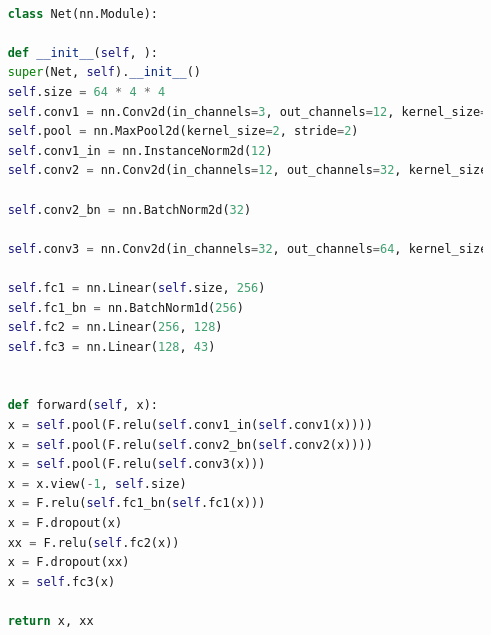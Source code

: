 \documentclass[twoside, 11pt,a4paper]{article}
\numberwithin{equation}{section}
\begin{document}
	\begin{lstlisting}[language=Python, caption=Kleines Netzwerk]
	
	class Net(nn.Module):
	
	def __init__(self, ):
	super(Net, self).__init__()
	self.size = 64 * 4 * 4
	self.conv1 = nn.Conv2d(in_channels=3, out_channels=12, kernel_size=5, padding=2)
	self.pool = nn.MaxPool2d(kernel_size=2, stride=2)
	self.conv1_in = nn.InstanceNorm2d(12)
	self.conv2 = nn.Conv2d(in_channels=12, out_channels=32, kernel_size=5, padding=2)
	
	self.conv2_bn = nn.BatchNorm2d(32)
	
	self.conv3 = nn.Conv2d(in_channels=32, out_channels=64, kernel_size=5, padding=2)
	
	self.fc1 = nn.Linear(self.size, 256)
	self.fc1_bn = nn.BatchNorm1d(256)
	self.fc2 = nn.Linear(256, 128)
	self.fc3 = nn.Linear(128, 43)
	
	
	def forward(self, x):
	x = self.pool(F.relu(self.conv1_in(self.conv1(x))))
	x = self.pool(F.relu(self.conv2_bn(self.conv2(x))))
	x = self.pool(F.relu(self.conv3(x)))
	x = x.view(-1, self.size)
	x = F.relu(self.fc1_bn(self.fc1(x)))
	x = F.dropout(x)
	xx = F.relu(self.fc2(x))
	x = F.dropout(xx)
	x = self.fc3(x)
	
	return x, xx
	
	\end{lstlisting}
	
\end{document}
